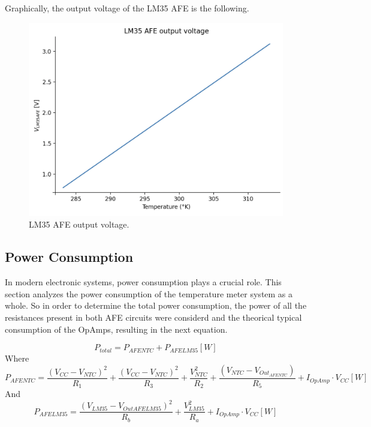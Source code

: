 \documentclass[12pt]{article}
\begin{document}
    Graphically, the output voltage of the LM35 AFE is the following.

    \begin{figure}[H] 
        \centering
        \includegraphics*[scale = 0.5]{images/Outafelm35.png}
        \caption{LM35 AFE output voltage.}
        \label{AFELM35}
    \end{figure}
\subsection{Power Consumption}

    In modern electronic systems, power consumption plays a crucial role. This section analyzes the power consumption of the temperature meter system as a whole.
    So in order to determine the total power consumption, the power of all the resistances present in both AFE circuits were considerd and the theorical 
    typical consumption of the OpAmps, resulting in the next equation.
    
    \begin{equation}
        P_{total} =  P_{AFENTC} + P_{AFELM35}[W] 
    \end{equation}
    Where
    \begin{equation}
        P_{AFENTC} = \frac{(V_{CC} - V_{NTC})^2}{R_1} + \frac{(V_{CC} - V_{NTC})^2}{R_3} + \frac{V_{NTC}^2}{R_2} + \frac{(V_{NTC} - V_{Out_{AFENTC}})}{R_5} + I_{OpAmp} \cdot V_{CC} [W]
    \end{equation}
    And
    \begin{equation}
        P_{AFELM35} = \frac{(V_{LM35} - V_{Out{AFELM35}})^2}{R_b} + \frac{V_{LM35}^2}{R_a} + I_{OpAmp} \cdot V_{CC} [W]
    \end{equation}
    
\end{document}
